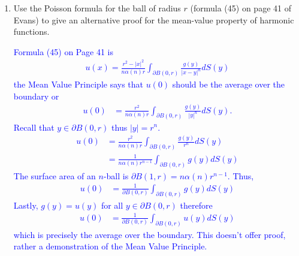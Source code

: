 \documentclass[10pt,a4paper]{report}
\newcommand{\BLUE}[1]{\textcolor{blue}{#1}}
\begin{document}
\begin{description}
\begin{enumerate}[label=\arabic*]
\begin{enumerate}[label=(\alph*)]
		\BLUE{\begin{align*}
			u(x) &=\int_{\partial U} \PAREN{\Phi(y-x)\PART{u}{\nu}(y) - u(y)\PART{\Phi}{\nu}(y-x)} dS_y - \int_U \Phi(y-x)\Delta u(y) dy \\
			 &= \int_{\partial U} \PAREN{\Phi(y-x)h(y) - u(y)h(y-x)} dS_y - \int_U \Phi(y-x)\Delta u(y) dy
		\end{align*}The text says "Observe that the term $\partial u/\partial \nu$ doesn't appear in (28): we introduced $\phi^x$ precisely to achieve this".  So, I do not at all understand this "strategy".\\
		}
		
		\item Use the Poisson formula for the ball of radius $r$ (formula (45) on page 41 of Evans) to give an alternative proof for the mean-value property of harmonic functions.
		
		\BLUE{Formula (45) on Page 41 is \begin{align*}
			u(x) = \frac{r^2-|x|^2}{n\alpha(n)r} \int_{\partial B(0,r)} \frac{g(y)}{|x-y|^n} dS(y)
		\end{align*}the Mean Value Principle says that $u(0)$ should be the average over the boundary or
		\begin{align*}
			u(0) &= \frac{r^2}{n\alpha(n)r} \int_{\partial B(0,r)} \frac{g(y)}{|y|^n} dS(y) .
		\end{align*}Recall that $y\in  \partial B(0,r)$ thus $|y|=r^n$.
		\begin{align*}
			u(0) &= \frac{r^2}{n\alpha(n)r} \int_{\partial B(0,r)} \frac{g(y)}{r^n} dS(y)\\
			&= \frac{1}{n\alpha(n)r^{n-1}} \int_{\partial B(0,r)} g(y) dS(y)
		\end{align*}The surface area of an $n$-ball is $\partial B(1,r) = n\alpha(n)r^{n-1}$.  Thus,
		\begin{align*}
			u(0) &= \frac{1}{\partial B(0,r)} \int_{\partial B(0,r)} g(y) dS(y)
		\end{align*}Lastly, $g(y) = u(y)$ for all $y \in \partial B(0,r)$ therefore
		\begin{align*}
			u(0) &= \frac{1}{\partial B(0,r)} \int_{\partial B(0,r)} u(y) dS(y)
		\end{align*}which is precisely the average over the boundary.  This doesn't offer proof, rather a demonstration of the Mean Value Principle.
		}
		
		\end{enumerate}
	
	\end{enumerate}
	

\end{description}
\end{document}
